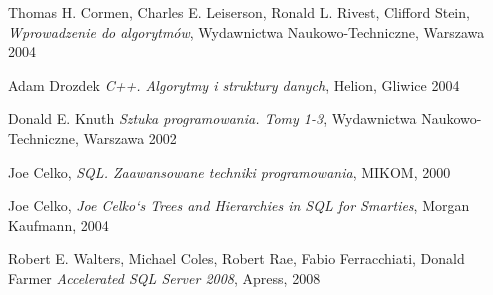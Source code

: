 %
%

\clearpage
{}
{}
\begin{thebibliography}{99}
\thispagestyle{empty}

 Thomas H. Cormen, Charles E. Leiserson, Ronald L. Rivest, Clifford Stein, 
    \emph{Wprowadzenie do algorytmów},
    Wydawnictwa Naukowo-Techniczne, Warszawa 2004

 Adam Drozdek
    \emph{C++. Algorytmy i struktury danych},
    Helion, Gliwice 2004

 Donald E. Knuth
    \emph{Sztuka programowania. Tomy 1-3},
    Wydawnictwa Naukowo-Techniczne, Warszawa 2002

 Joe Celko,
    \emph{SQL. Zaawansowane techniki programowania},
    MIKOM, 2000

 Joe Celko,
    \emph{Joe Celko`s Trees and Hierarchies in SQL for Smarties}, 
    Morgan Kaufmann, 2004

 Robert E. Walters, Michael Coles, Robert Rae, Fabio Ferracchiati, Donald Farmer
    \emph{Accelerated SQL Server 2008},
    Apress, 2008

%     
%     

\end{thebibliography} 

